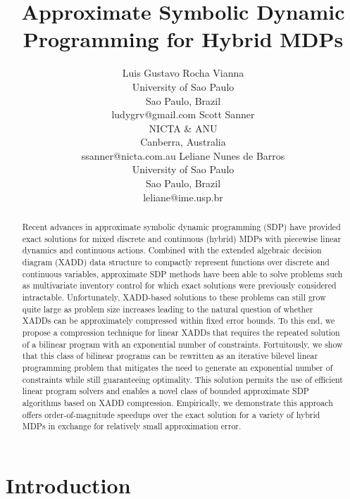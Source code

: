 \documentclass{article}
\title{	Approximate Symbolic Dynamic Programming for Hybrid MDPs }
\author{Luis Gustavo Rocha Vianna\\
University of Sao Paulo\\
Sao Paulo, Brazil\\
ludygrv@gmail.com
\And
Scott Sanner\\
NICTA \& ANU\\
Canberra, Australia\\
ssanner@nicta.com.au
\And
Leliane Nunes de Barros\\
University of Sao Paulo\\
Sao Paulo, Brazil\\
leliane@ime.usp.br}
\begin{document}
\maketitle

\begin{abstract}
Recent advances in approximate symbolic dynamic programming (SDP) have 
provided exact solutions for mixed discrete and continuous (hybrid) 
MDPs with piecewise linear dynamics and continuous actions. Combined 
with the extended algebraic decision diagram (XADD) data structure to 
compactly represent functions over discrete and continuous variables, 
approximate SDP methods have been able to solve problems such as 
multivariate inventory control for which exact solutions were 
previously considered intractable. Unfortunately, XADD-based 
solutions to these problems can still grow quite large as problem size 
increases leading to the natural question of whether XADDs can be 
approximately compressed within fixed error bounds. To this end, we 
propose a compression technique for linear XADDs that requires the 
repeated solution of a bilinear program with an exponential number of 
constraints. Fortuitously, we show that this class of bilinear 
programs can be rewritten as an iterative bilevel linear programming 
problem that mitigates the need to generate an exponential number of 
constraints while still guaranteeing optimality. This solution 
permits the use of efficient linear program solvers and enables a 
novel class of bounded approximate SDP algorithms based on XADD 
compression. Empirically, we demonstrate this approach offers 
order-of-magnitude speedups over the exact solution for a variety of 
hybrid MDPs in exchange for relatively small approximation error.
\end{abstract}

\section{Introduction}

\cite{sanner_uai11}





\end{document}

